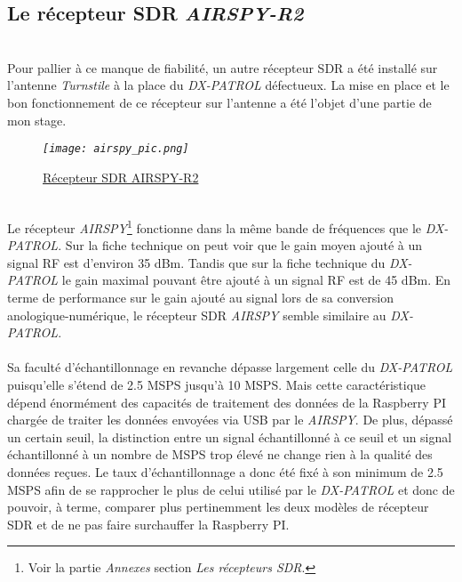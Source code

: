 \documentclass[12pt,fleqn]{book} %
\begin{document}
\subsection{Le récepteur SDR \emph{AIRSPY-R2}}
~\\Pour pallier à ce manque de fiabilité, un autre récepteur SDR a été installé sur l'antenne \emph{Turnstile} à la place du \emph{DX-PATROL} défectueux. La mise en place et le bon fonctionnement de ce récepteur sur l'antenne a été l'objet d'une partie de mon stage.
\begin{figure}[H]
	\centering
	\itshape
	\texttt{[image: airspy\_pic.png]}
	\caption{\label{airspy_pic} \underline{Récepteur SDR AIRSPY-R2}}
\end{figure}
~\\Le récepteur \emph{AIRSPY}\footnote{Voir la partie \emph{Annexes} section \emph{Les récepteurs SDR}.} fonctionne dans la même bande de fréquences que le \emph{DX-PATROL}. Sur la fiche technique on peut voir que le gain moyen ajouté à un signal RF est d'environ 35 dBm. Tandis que sur la fiche technique du \emph{DX-PATROL} le gain maximal pouvant être ajouté à un signal RF est de 45 dBm.
En terme de performance sur le gain ajouté au signal lors de sa conversion anologique-numérique, le récepteur SDR \emph{AIRSPY} semble similaire au \emph{DX-PATROL}.
~\\\\Sa faculté d'échantillonnage en revanche dépasse largement celle du \emph{DX-PATROL} puisqu'elle s'étend de 2.5 MSPS jusqu'à 10 MSPS. Mais cette caractéristique dépend énormément des capacités de traitement des données de la Raspberry PI chargée de traiter les données envoyées via USB par le \emph{AIRSPY}. De plus, dépassé un certain seuil, la distinction entre un signal échantillonné à ce seuil et un signal échantillonné à un nombre de MSPS trop élevé ne change rien à la qualité des données reçues.
Le taux d'échantillonnage a donc été fixé à son minimum de 2.5 MSPS afin de se rapprocher le plus de celui utilisé par le \emph{DX-PATROL} et donc de pouvoir, à terme, comparer plus pertinemment les deux modèles de récepteur SDR et de ne pas faire surchauffer la Raspberry PI.
\end{document}
